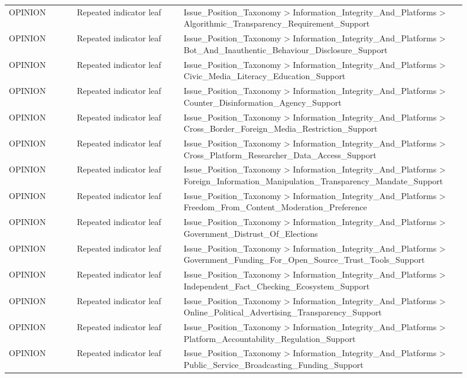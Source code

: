 \begin{table}[htbp]
\begin{threeparttable}
\begin{tabular}{p{0.14\linewidth}p{0.22\linewidth}p{0.54\linewidth}}
OPINION & Repeated indicator leaf & Issue\_Position\_Taxonomy > Information\_Integrity\_And\_Platforms > Algorithmic\_Transparency\_Requirement\_Support \\
OPINION & Repeated indicator leaf & Issue\_Position\_Taxonomy > Information\_Integrity\_And\_Platforms > Bot\_And\_Inauthentic\_Behaviour\_Disclosure\_Support \\
OPINION & Repeated indicator leaf & Issue\_Position\_Taxonomy > Information\_Integrity\_And\_Platforms > Civic\_Media\_Literacy\_Education\_Support \\
OPINION & Repeated indicator leaf & Issue\_Position\_Taxonomy > Information\_Integrity\_And\_Platforms > Counter\_Disinformation\_Agency\_Support \\
OPINION & Repeated indicator leaf & Issue\_Position\_Taxonomy > Information\_Integrity\_And\_Platforms > Cross\_Border\_Foreign\_Media\_Restriction\_Support \\
OPINION & Repeated indicator leaf & Issue\_Position\_Taxonomy > Information\_Integrity\_And\_Platforms > Cross\_Platform\_Researcher\_Data\_Access\_Support \\
OPINION & Repeated indicator leaf & Issue\_Position\_Taxonomy > Information\_Integrity\_And\_Platforms > Foreign\_Information\_Manipulation\_Transparency\_Mandate\_Support \\
OPINION & Repeated indicator leaf & Issue\_Position\_Taxonomy > Information\_Integrity\_And\_Platforms > Freedom\_From\_Content\_Moderation\_Preference \\
OPINION & Repeated indicator leaf & Issue\_Position\_Taxonomy > Information\_Integrity\_And\_Platforms > Government\_Distrust\_Of\_Elections \\
OPINION & Repeated indicator leaf & Issue\_Position\_Taxonomy > Information\_Integrity\_And\_Platforms > Government\_Funding\_For\_Open\_Source\_Trust\_Tools\_Support \\
OPINION & Repeated indicator leaf & Issue\_Position\_Taxonomy > Information\_Integrity\_And\_Platforms > Independent\_Fact\_Checking\_Ecosystem\_Support \\
OPINION & Repeated indicator leaf & Issue\_Position\_Taxonomy > Information\_Integrity\_And\_Platforms > Online\_Political\_Advertising\_Transparency\_Support \\
OPINION & Repeated indicator leaf & Issue\_Position\_Taxonomy > Information\_Integrity\_And\_Platforms > Platform\_Accountability\_Regulation\_Support \\
OPINION & Repeated indicator leaf & Issue\_Position\_Taxonomy > Information\_Integrity\_And\_Platforms > Public\_Service\_Broadcasting\_Funding\_Support \\

\end{tabular}
\end{threeparttable}
\end{table}
